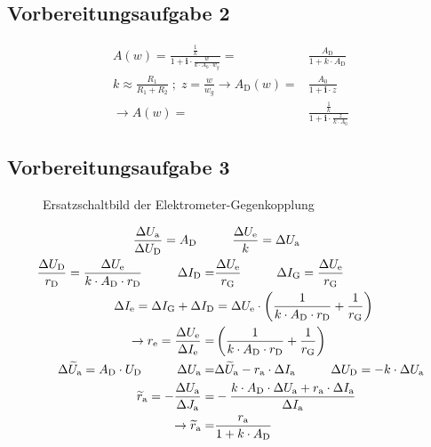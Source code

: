 \documentclass[numbers=noenddot,12pt,a4paper]{scrartcl}
\newcommand{\ix}[1]{_\text{#1}}
\newcommand{\imag}{\mathbf{i}}
\begin{document}
\subsection{Vorbereitungsaufgabe 2}
\begin{align*}
A(w)=\frac{\frac{1}{k}}{1+\imag\cdot\frac{w}{k\cdot A_0\cdot w_g}}=&\frac{A\ix{D}}{1+k\cdot A\ix{D}} \\
k\approx\frac{R_1}{R_1+R_2} \; ; \; z=\frac{w}{w_g} \rightarrow A\ix{D}(w)=&\frac{A_0}{1+\imag\cdot z} \\
\rightarrow A(w)=&\frac{\frac{1}{k}}{1+\imag\cdot \frac{z}{k\cdot A_0}}
\end{align*}
\subsection{Vorbereitungsaufgabe 3}
\begin{figure}[H]
\vspace{5cm}
\caption{Ersatzschaltbild der Elektrometer-Gegenkopplung} \label{img:ersatzskizze}
\end{figure}
\begin{align*}
\frac{\Delta U\ix{a}}{\Delta U\ix{D}}=A\ix{D} \hspace{0.5cm}&\hspace{0.5cm} \frac{\Delta U\ix{e}}{k}=\Delta U\ix{a} \\
\frac{\Delta U\ix{D}}{r\ix{D}}=\frac{\Delta U\ix{e}}{k\cdot A\ix{D}\cdot r\ix{D}} \hspace{1cm} \Delta I\ix{D}=&\frac{\Delta U\ix{e}}{r\ix{G}} \hspace{1cm} \Delta I\ix{G}=\frac{\Delta U\ix{e}}{r\ix{G}} \\
\Delta I\ix{e}=\Delta I\ix{G}+\Delta I\ix{D}&=\Delta U\ix{e}\cdot\left(\frac{1}{k\cdot A\ix{D}\cdot r\ix{D}}+\frac{1}{r\ix{G}}\right) \\
\rightarrow r\ix{e}=\frac{\Delta U\ix{e}}{\Delta I\ix{e}}=&\left(\frac{1}{k\cdot A\ix{D}\cdot r\ix{D}}+\frac{1}{r\ix{G}}\right) \\
\Delta \widetilde{U}\ix{a}=A\ix{D}\cdot U\ix{D} \hspace{1cm} \Delta U\ix{a}=&\Delta\widetilde{U}\ix{a}-r\ix{a}\cdot\Delta I\ix{a} \hspace{1cm} \Delta U\ix{D}=-k\cdot\Delta U\ix{a} \\
\widetilde{r}\ix{a}=-\frac{\Delta U\ix{a}}{\Delta J\ix{a}}=&-\frac{k\cdot A\ix{D}\cdot\Delta U\ix{a}+r\ix{a}\cdot\Delta I\ix{a}}{\Delta I\ix{a}} \\ \rightarrow \widetilde{r}\ix{a}=&\frac{r\ix{a}}{1+k\cdot A\ix{D}}
\end{align*}
\end{document}
